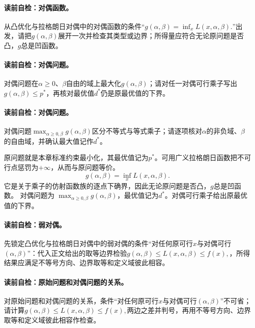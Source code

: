 \paragraph{读前自检：对偶函数。}从凸优化与拉格朗日对偶中的对偶函数的条件“$g(\alpha,\beta)=\inf_x L(x,\alpha,\beta).$”出发，请把$g(\alpha,\beta)$展开一次并检查其类型或边界；所得量应符合无论原问题是否凸，$g$总是凹函数。\par
\paragraph{读前自检：对偶问题。}对偶问题在$\alpha\ge0$、$\beta$自由的域上最大化$g(\alpha,\beta)$；请对任一对偶可行乘子写出$g(\alpha,\beta)\le p^*$，再核对最优值$d^*$仍是原最优值的下界。\par
\paragraph{读前自检：对偶问题。}对偶问题$\max_{\alpha\ge0,\beta}g(\alpha,\beta)$区分不等式与等式乘子；请逐项核对$\alpha$的非负域、$\beta$的自由域，并确认最大值记作$d^*$。\par

原问题就是本章标准约束最小化，其最优值记为$p^*$。可用广义拉格朗日函数把不可行点惩罚为$+\infty$，从而与原问题等价。
\[
g(\alpha,\beta)=\inf_x L(x,\alpha,\beta).
\]
它是关于乘子的仿射函数族的逐点下确界，因此无论原问题是否凸，$g$总是凹函数。
对偶问题为 $\max_{\alpha\ge0,\beta}g(\alpha,\beta)$，最优值记为$d^*$。对偶可行乘子给出原最优值的下界。


\paragraph{读前自检：弱对偶。}先锁定凸优化与拉格朗日对偶中的弱对偶的条件“对任何原可行$x$与对偶可行$(\alpha,\beta)$”：代入正文给出的取等边界检验$g(\alpha,\beta)\le L(x,\alpha,\beta)\le f(x),$，所得结果应满足不等号方向、边界取等和定义域彼此相容。\par
\paragraph{读前自检：原始问题和对偶问题的关系。}对原始问题和对偶问题的关系，条件“对任何原可行$x$与对偶可行$(\alpha,\beta)$”不可省；请计算$g(\alpha,\beta)\le L(x,\alpha,\beta)\le f(x),$两边之差并判号，再用不等号方向、边界取等和定义域彼此相容作检查。\par
